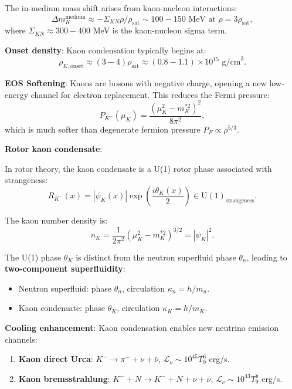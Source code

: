 \documentclass[12pt,a4paper]{article}
\theoremstyle{definition}
\theoremstyle{remark}
\begin{document}
The in-medium mass shift arises from kaon-nucleon interactions:
\begin{equation}
\Delta m_K^{\text{medium}} \approx -\Sigma_{KN} \rho/\rho_{\text{sat}} \sim 100-150 \text{ MeV at } \rho = 3\rho_{\text{sat}},
\end{equation}
where $\Sigma_{KN} \approx 300-400$ MeV is the kaon-nucleon sigma term.

\textbf{Onset density}: Kaon condensation typically begins at:
\begin{equation}
\rho_{K,\text{onset}} \approx (3-4) \rho_{\text{sat}} \approx (0.8-1.1) \times 10^{15} \text{ g/cm}^3.
\end{equation}

\textbf{EOS Softening}: Kaons are bosons with negative charge, opening a new low-energy channel for electron replacement. This reduces the Fermi pressure:
\begin{equation}
P_{K^-}(\mu_K) = \frac{(\mu_K^2 - m_K^{*2})^2}{8\pi^2},
\end{equation}
which is much softer than degenerate fermion pressure $P_F \propto \rho^{5/3}$.

\textbf{Rotor kaon condensate}:

In rotor theory, the kaon condensate is a U(1) rotor phase associated with strangeness:
\begin{equation}
R_{K^-}(x) = |\psi_K(x)| \exp\left(\frac{i\theta_K(x)}{2}\right) \in \mathrm{U}(1)_{\text{strangeness}}.
\end{equation}

The kaon number density is:
\begin{equation}
n_K = \frac{1}{2\pi^2} (\mu_K^2 - m_K^{*2})^{3/2} = |\psi_K|^2.
\end{equation}

The U(1) phase $\theta_K$ is distinct from the neutron superfluid phase $\theta_n$, leading to \textbf{two-component superfluidity}:
\begin{itemize}
\item Neutron superfluid: phase $\theta_n$, circulation $\kappa_n = h/m_n$.
\item Kaon condensate: phase $\theta_K$, circulation $\kappa_K = h/m_K$.
\end{itemize}

\textbf{Cooling enhancement}: Kaon condensation enables new neutrino emission channels:
\begin{enumerate}
\item \textbf{Kaon direct Urca}: $K^- \to \pi^- + \nu + \bar{\nu}$, $\mathcal{L}_\nu \sim 10^{45} T_9^6$ erg/s.
\item \textbf{Kaon bremsstrahlung}: $K^- + N \to K^- + N + \nu + \bar{\nu}$, $\mathcal{L}_\nu \sim 10^{43} T_9^8$ erg/s.
\end{enumerate}
\end{document}

